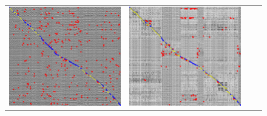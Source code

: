 \documentclass[letterpaper, 10 pt, conference]{ieeeconf}  %
\begin{document}
\begin{figure}[!h]
\begin{tabular*}{\textwidth}[t]{cccc}
  \includegraphics[width=\imgW,height=\imgH]{cta-rail-without-bad-106} &
  \includegraphics[width=\imgW,height=\imgH]{cta-rail-with-bad-306} &

\end{tabular*}
\end{figure}
\end{document}
